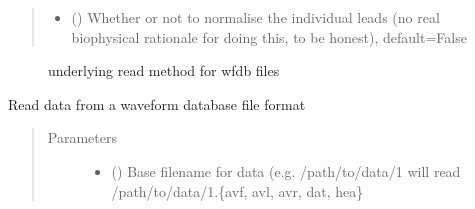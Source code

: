 \documentclass[letterpaper,10pt,english]{sphinxmanual}
\begin{document}
\begin{fulllineitems}
\begin{fulllineitems}
\begin{quote}
\begin{description}
\begin{itemize}
\item {} 
\sphinxAtStartPar
{} (\sphinxstyleliteralemphasis{\sphinxupquote{, }}) \textendash{} Whether or not to normalise the individual leads (no real biophysical rationale for doing this,
to be honest), default=False

\end{itemize}

\end{description}\end{quote}


\nopagebreak

\begin{description}
\item[{{\hyperref[\detokenize{_autosummary/signalanalysis.ecg.Ecg:id5}]{}}}] \leavevmode
\sphinxAtStartPar
underlying read method for wfdb files

\end{description}



\end{fulllineitems}


\begin{fulllineitems}
\label{\detokenize{_autosummary/signalanalysis.ecg.Ecg:id5}}
\sphinxAtStartPar
Read data from a waveform database file format
\begin{quote}\begin{description}
\item[{Parameters}] \leavevmode\begin{itemize}
\item {} 
\sphinxAtStartPar
{} () \textendash{} Base filename for data (e.g. /path/to/data/1 will read /path/to/data/1.\{avf, avl, avr, dat, hea\}


\end{itemize}
\end{description}
\end{quote}
\end{fulllineitems}
\end{fulllineitems}
\end{document}
